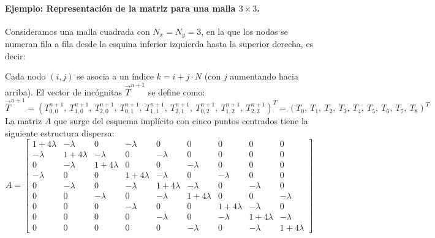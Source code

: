 \documentclass{article}
\begin{document}
\paragraph{Ejemplo: Representación de la matriz para una malla $3 \times 3$.} Consideramos una malla cuadrada con $N_x = N_y = 3$, en la que los nodos se numeran fila a fila desde la esquina inferior izquierda hasta la superior derecha, es decir:
\begin{center}

\vspace{0.5em}
\end{center}
Cada nodo $(i,j)$ se asocia a un índice $k = i + j \cdot N$ (con $j$ aumentando hacia arriba). El vector de incógnitas $\vec{T}^{n+1}$ se define como:
$$
\vec{T}^{n+1} = \left( T_{0,0}^{n+1},\ T_{1,0}^{n+1},\ T_{2,0}^{n+1},\ T_{0,1}^{n+1},\ T_{1,1}^{n+1},\ T_{2,1}^{n+1},\ T_{0,2}^{n+1},\ T_{1,2}^{n+1},\ T_{2,2}^{n+1} \right)^T 
= \left( T_0,\ T_1,\ T_2,\ T_3,\ T_4,\ T_5,\ T_6,\ T_7,\ T_8 \right)^T
$$
La matriz $A$ que surge del esquema implícito con cinco puntos centrados tiene la siguiente estructura dispersa:
$$
A =
\begin{bmatrix}
1+4\lambda & -\lambda & 0         & -\lambda & 0         & 0         & 0         & 0         & 0 \\
-\lambda   & 1+4\lambda & -\lambda & 0         & -\lambda & 0         & 0         & 0         & 0 \\
0         & -\lambda & 1+4\lambda & 0         & 0         & -\lambda & 0         & 0         & 0 \\
-\lambda   & 0         & 0         & 1+4\lambda & -\lambda & 0         & -\lambda & 0         & 0 \\
0         & -\lambda & 0         & -\lambda & 1+4\lambda & -\lambda & 0         & -\lambda & 0 \\
0         & 0         & -\lambda & 0         & -\lambda & 1+4\lambda & 0         & 0         & -\lambda \\
0         & 0         & 0         & -\lambda & 0         & 0         & 1+4\lambda & -\lambda & 0 \\
0         & 0         & 0         & 0         & -\lambda & 0         & -\lambda & 1+4\lambda & -\lambda \\
0         & 0         & 0         & 0         & 0         & -\lambda & 0         & -\lambda & 1+4\lambda
\end{bmatrix}
$$
\end{document}
